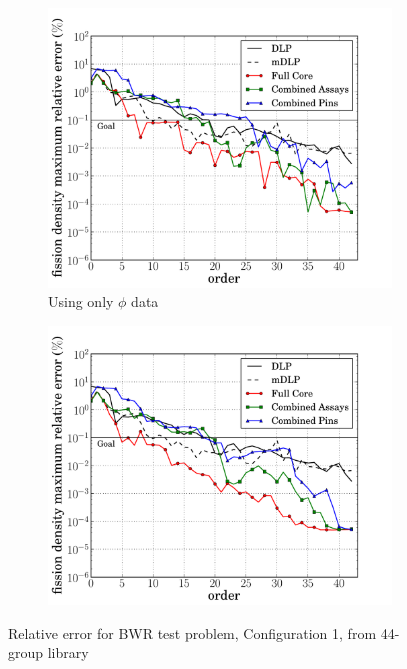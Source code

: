 \documentclass[5p,times,twocolumn,10pt]{elsarticle}
\begin{document}
    \begin{figure}[tb]
        \centering
        \begin{subfigure}{0.5\textwidth}
            \centering
            \includegraphics[trim=.1cm .25cm 2.0cm .4cm, clip=true,
            totalheight=0.261\textheight]
            {BWR1_44_energy_basis_comparison_fission-44}
            \caption{Using only $\phi$ data}
            \label{fig:core1-44a}
        \end{subfigure}%
        \begin{subfigure}{0.5\textwidth}
            \centering
            \includegraphics[trim=.1cm .25cm 2.0cm .4cm, clip=true,
            totalheight=0.261\textheight]
            {BWR1_44_partial_energy_basis_comparison_fission-44}
            \label{fig:core1-44b}
        \end{subfigure}
        \caption{Relative error for BWR test problem, Configuration 1, from
            44-group library}
        \label{fig:core1-44}
    \end{figure}
\end{document}
